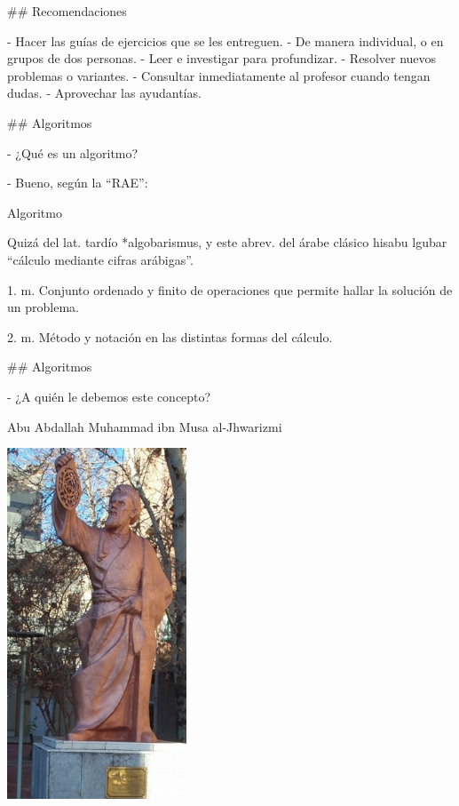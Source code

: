## Recomendaciones

\vfill

- Hacer las guías de ejercicios que se les entreguen.
    - De manera individual, o en grupos de dos personas.
- Leer e investigar para profundizar.
- Resolver nuevos problemas o variantes.
- Consultar inmediatamente al profesor cuando tengan dudas.
- Aprovechar las ayudantías.

\vfill

## Algoritmos

- ¿Qué es un algoritmo?

\pause

- Bueno, según la ``RAE'':

\begin{block}{Algoritmo}

    \justifying
 \begin{small}
 Quizá del lat. tardío *algobarismus, y este abrev. del árabe clásico hisabu lgubar ``cálculo mediante cifras arábigas''.\\[1em]
 \end{small}

 \alert<3->{1. m. Conjunto ordenado y finito de operaciones que permite hallar la solución de un problema.\\[1em]}

 2. m. Método y notación en las distintas formas del cálculo.

\end{block}


## Algoritmos

\bgncolumns


\vspace{-1em}

- ¿A quién le debemos este concepto?

\pause

\bgnblockgood[wd=.8\textwidth]
Abu Abdallah Muhammad ibn Musa al-Jhwarizmi 
\trmblockgood

\includegraphics[width=0.4\textwidth,valign=t]{img/Khwarizmi_Amirkabir_University_of_Technology.jpg}
\trmcolumns


